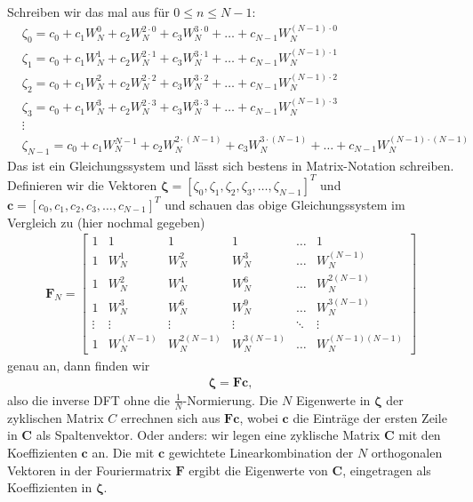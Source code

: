Schreiben wir das mal aus für $0\leq n \leq N-1$:
\begin{align}
&\zeta_0 = c_0 + c_1 W_N^0 + c_2 W_N^{2\cdot0} + c_3 W_N^{3\cdot0} + \dots + c_{N-1} W_N^{(N-1) \cdot 0}\nonumber\\
&\zeta_1 = c_0 + c_1 W_N^1 + c_2 W_N^{2\cdot1} + c_3 W_N^{3\cdot1} + \dots + c_{N-1} W_N^{(N-1) \cdot1}\nonumber\\
&\zeta_2 = c_0 + c_1 W_N^2 + c_2 W_N^{2\cdot2} + c_3 W_N^{3\cdot2} + \dots + c_{N-1} W_N^{(N-1) \cdot2}\nonumber\\
&\zeta_3 = c_0 + c_1 W_N^3 + c_2 W_N^{2\cdot3} + c_3 W_N^{3\cdot3} + \dots + c_{N-1} W_N^{(N-1) \cdot3}\nonumber\\
&\vdots\nonumber\\
&\zeta_{N-1} = c_0 + c_1 W_N^{N-1} + c_2 W_N^{2\cdot(N-1)} + c_3 W_N^{3\cdot(N-1)} + \dots + c_{N-1} W_N^{(N-1) \cdot(N-1)}
\end{align}
Das ist ein Gleichungssystem und lässt sich bestens in Matrix-Notation schreiben.
Definieren wir die Vektoren $\bm{\zeta} = [\zeta_0, \zeta_1, \zeta_2, \zeta_3, \dots, \zeta_{N-1}]^T$
und $\bm{c} = [c_0, c_1, c_2, c_3, \dots, c_{N-1}]^T$ und schauen das obige
Gleichungssystem im Vergleich zu  (hier nochmal gegeben)
\begin{align*}
\bm{F}_N =
\begin{bmatrix}
1 & 1 & 1 & 1 & \dots & 1\\[1em]
1 & W_N^1 & W_N^2 & W_N^3 & \dots & W_N^{(N-1)}\\[1em]
1 & W_N^2 & W_N^4 & W_N^6 & \dots & W_N^{2(N-1)}\\[1em]
1 & W_N^3 & W_N^6 & W_N^9 & \dots & W_N^{3(N-1)}\\[1em]
\vdots & \vdots & \vdots &\vdots &\ddots & \vdots\\[1em]
1 & W_N^{(N-1)} & W_N^{2(N-1)} & W_N^{3(N-1)} & \dots & W_N^{(N-1)(N-1)}
\end{bmatrix}
\end{align*}
genau an, dann finden wir
\begin{align}
\bm{\zeta} = \bm{F} \bm{c},
\end{align}
also die inverse DFT ohne die $\frac{1}{N}$-Normierung.
%
Die $N$ Eigenwerte in $\bm{\zeta}$ der zyklischen Matrix $C$ errechnen sich
aus $\bm{F} \bm{c}$, wobei $\bm{c}$ die Einträge der ersten Zeile in $\bm{C}$
als Spaltenvektor.
%
Oder anders: wir legen eine zyklische Matrix $\bm{C}$ mit den Koeffizienten
$\bm{c}$ an. Die mit $\bm{c}$ gewichtete Linearkombination
der $N$ orthogonalen Vektoren in der Fouriermatrix $\bm{F}$ ergibt die Eigenwerte
von $\bm{C}$, eingetragen als Koeffizienten in $\bm{\zeta}$.

